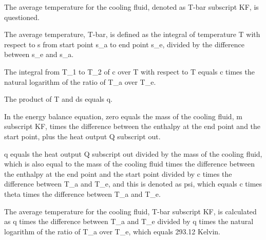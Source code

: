 The average temperature for the cooling fluid, denoted as T-bar subscript KF, is questioned.

The average temperature, T-bar, is defined as the integral of temperature T with respect to s from start point s_a to end point s_e, divided by the difference between s_e and s_a.

The integral from T_1 to T_2 of c over T with respect to T equals c times the natural logarithm of the ratio of T_a over T_e.

The product of T and ds equals q.

In the energy balance equation, zero equals the mass of the cooling fluid, m subscript KF, times the difference between the enthalpy at the end point and the start point, plus the heat output Q subscript out.

q equals the heat output Q subscript out divided by the mass of the cooling fluid, which is also equal to the mass of the cooling fluid times the difference between the enthalpy at the end point and the start point divided by c times the difference between T_a and T_e, and this is denoted as psi, which equals c times theta times the difference between T_a and T_e.

The average temperature for the cooling fluid, T-bar subscript KF, is calculated as q times the difference between T_a and T_e divided by q times the natural logarithm of the ratio of T_a over T_e, which equals 293.12 Kelvin.